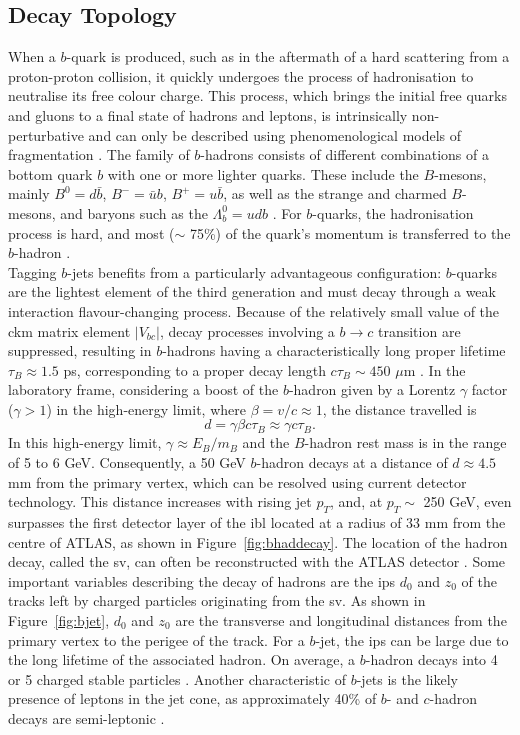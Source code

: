 \subsection{Decay Topology}
When a $b$-quark is produced, such as in the aftermath of a hard scattering from a proton-proton collision, it quickly undergoes the process of hadronisation to neutralise its free colour charge. This process, which brings the initial free quarks and gluons to a final state of hadrons and leptons, is intrinsically non-perturbative and can only be described using phenomenological models of fragmentation \cite{Webber:419784}. The family of $b$-hadrons consists of different combinations of a bottom quark $b$ with one or more lighter quarks. These include the $B$-mesons, mainly $B^0=d\bar{b}$, $B^-=\bar{u}b$, $B^+=u\bar{b}$, as well as the strange and charmed $B$-mesons, and baryons such as the $\Lambda_b^0=udb$ \cite{ATL-PHYS-PUB-2014-008}. For $b$-quarks, the hadronisation process is hard, and most ($\sim$ 75\%) of the quark's momentum is transferred to the $b$-hadron \cite{Webber:419784}. \\

Tagging $b$-jets benefits from a particularly advantageous configuration: $b$-quarks are the lightest element of the third generation and must decay through a weak interaction flavour-changing process. Because of the relatively small value of the \gls{ckm} matrix element $|V_{bc}|$, decay processes involving a $b \rightarrow c$ transition are suppressed, resulting in $b$-hadrons having a characteristically long proper lifetime $\tau_B \approx 1.5$ ps, corresponding to a proper decay length $c\tau_{B} \sim 450$ $\mu$m \cite{Tanabashi:2018oca}. In the laboratory frame, considering a boost of the $b$-hadron given by a Lorentz $\gamma$ factor ($\gamma > 1$) in the high-energy limit, where $\beta = v/c \approx 1$, the distance travelled is \[d = \gamma \beta c \tau_B \approx \gamma c \tau_B.\] In this high-energy limit, $\gamma \approx E_B / m_B$ and the $B$-hadron rest mass is in the range of 5 to 6 GeV. Consequently, a 50 GeV $b$-hadron decays at a distance of $d \approx 4.5$ mm from the primary vertex, which can be resolved using current detector technology. This distance increases with rising jet $p_T$, and, at $p_T \sim$ 250 GeV, even surpasses the first detector layer of the \gls{ibl} located at a radius of 33 mm from the centre of ATLAS, as shown in Figure~\ref{fig:bhaddecay}. The location of the hadron decay, called the \gls{sv}, can often be reconstructed with the ATLAS detector \cite{Aad:2019aic}. Some important variables describing the decay of hadrons are the \glspl{ip} $d_0$ and $z_0$ of the tracks left by charged particles originating from the \gls{sv}. As shown in Figure~\ref{fig:bjet}, $d_0$ and $z_0$ are the transverse and longitudinal distances from the primary vertex to the perigee of the track. For a $b$-jet, the \glspl{ip} can be large due to the long lifetime of the associated hadron. On average, a $b$-hadron decays into 4 or 5 charged stable particles \cite{ATL-PHYS-PUB-2014-008}. Another characteristic of $b$-jets is the likely presence of leptons in the jet cone, as approximately 40\% of $b$- and $c$-hadron decays are semi-leptonic \cite{Tanabashi:2018oca}. \\

